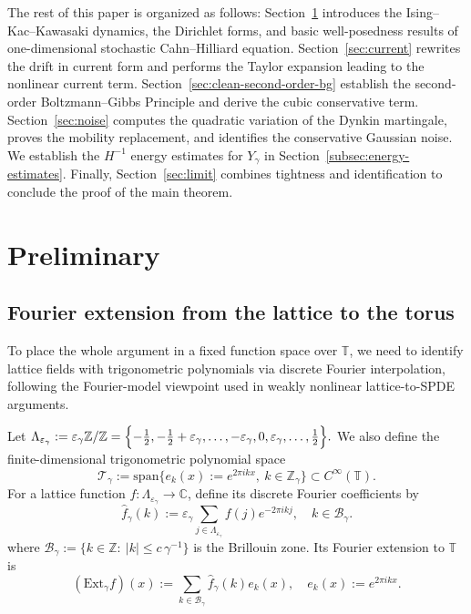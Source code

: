 \documentclass{article}
\begin{document}
The rest of this paper is organized as follows: 
Section~\ref{sec:prel} introduces the Ising--Kac--Kawasaki dynamics, the Dirichlet forms, and basic well-posedness results of one-dimensional stochastic Cahn–Hilliard equation.
Section~\ref{sec:current} rewrites the drift in current form and performs the Taylor expansion leading to the nonlinear current term.
Section~\ref{sec:clean-second-order-bg} establish the second-order Boltzmann--Gibbs Principle and derive the cubic conservative term.
Section~\ref{sec:noise} computes the quadratic variation of the Dynkin martingale, proves the mobility replacement, and identifies the conservative Gaussian noise. We establish the $H^{-1}$ energy estimates for $Y_{\gamma}$ in Section~\ref{subsec:energy-estimates}.
Finally, Section~\ref{sec:limit} combines tightness and identification to conclude the proof of the main theorem.


\section{Preliminary}\label{sec:prel}

\subsection{Fourier extension from the lattice to the torus}
\label{subsec:fourier-extension}

To place the whole argument in a fixed function space over \(\mathbb T\), we need to identify lattice fields
with trigonometric polynomials via discrete Fourier interpolation, following the Fourier-model viewpoint
used in weakly nonlinear lattice-to-SPDE arguments.

Let
\(
\Lambda_{\varepsilon_\gamma}:=\varepsilon_\gamma \mathbb Z/\mathbb Z
=
\Bigl\{-\frac{1}{2}, -\frac{1}{2} + \varepsilon_\gamma, \dots, -\varepsilon_\gamma, 0,\varepsilon_\gamma,\dots, \frac{1}{2}\Bigr\}.
\)
We also define the finite-dimensional trigonometric polynomial space
\[
\mathcal T_\gamma
:=
\mathrm{span}\{e_k(x):=e^{2\pi i kx},\ k\in\mathbb Z_\gamma\}
\subset C^\infty(\mathbb T).
\]
For a lattice function \(f:\Lambda_{\varepsilon_\gamma}\to\mathbb C\), define its discrete Fourier coefficients by
\[
\widehat f_\gamma(k):=
\varepsilon_\gamma\sum_{j\in\Lambda_{\varepsilon_\gamma}}f(j)e^{-2\pi i kj},
\quad k\in\mathcal B_\gamma.
\]
where
\(
\mathcal B_\gamma:=\{k\in\mathbb Z:\ |k|\le c\,\gamma^{-1}\}
\)
is the Brillouin zone.
Its Fourier extension to \(\mathbb T\) is
\[
(\mathrm{Ext}_\gamma f)(x)
:=
\sum_{k\in\mathcal B_\gamma}\widehat f_\gamma(k)e_k(x),\quad
e_k(x):=e^{2\pi i kx}.
\]
\end{document}
